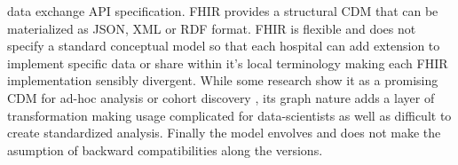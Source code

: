 data exchange API specification. FHIR provides a structural CDM that can be
materialized as JSON, XML or RDF format. FHIR is flexible and does not specify
a standard conceptual model so that each hospital can add extension to
implement specific data or share within it's local terminology making each FHIR
implementation sensibly divergent. While some research show it as a promising
CDM for ad-hoc analysis \cite{fhir-google} or cohort discovery
\cite{fhir-paris}, its graph nature adds a layer of transformation making usage
complicated for data-scientists as well as difficult to create standardized
analysis. Finally the model envolves and does not make the asumption of
backward compatibilities along the versions.

